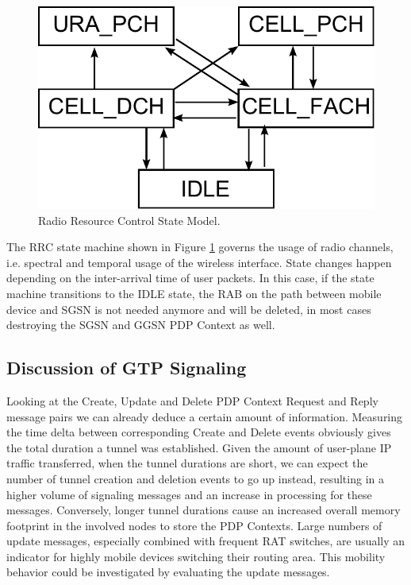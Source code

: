 \begin{figure}
	\centering
	\includegraphics[width=0.6\columnwidth]{images/rrc-state-model.pdf}
	\caption{Radio Resource Control State Model.}
	\label{fig:rrcstatemodel-CONEXT}
\end{figure}

The \ac{RRC} state machine shown in Figure \ref{fig:rrcstatemodel-CONEXT} governs the usage of radio channels, i.e. spectral and temporal usage of the wireless interface. State changes happen depending on the inter-arrival time of user packets. In this case, if the state machine transitions to the IDLE state, the \ac{RAB} on the path between mobile device and \ac{SGSN} is not needed anymore and will be deleted, in most cases destroying the SGSN and GGSN PDP Context as well.




\subsection{Discussion of GTP Signaling}

Looking at the Create, Update and Delete PDP Context Request and Reply message pairs we can already deduce a certain amount of information. Measuring the time delta between corresponding Create and Delete events obviously gives the total duration a tunnel was established. Given the amount of user-plane IP traffic transferred, when the tunnel durations are short, we can expect the number of tunnel creation and deletion events to go up instead, resulting in a higher volume of signaling messages and an increase in processing for these messages. Conversely, longer tunnel durations cause an increased overall memory footprint in the involved nodes to store the \ac{PDP} Contexts. Large numbers of update messages, especially combined with frequent \ac{RAT} switches, are usually an indicator for highly mobile devices switching their routing area. This mobility behavior could be investigated by evaluating the update messages.

